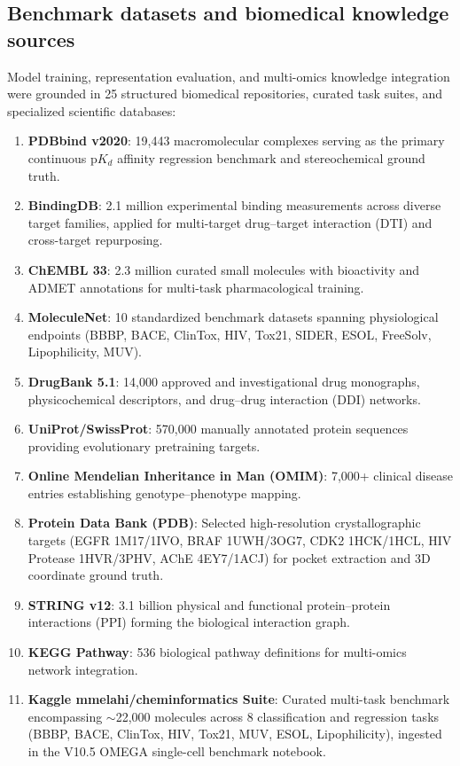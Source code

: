 \documentclass[11pt,a4paper]{article}
\begin{document}
\subsection*{Benchmark datasets and biomedical knowledge sources}
Model training, representation evaluation, and multi-omics knowledge integration were grounded in 25 structured biomedical repositories, curated task suites, and specialized scientific databases:
\begin{enumerate}
    \item \textbf{PDBbind v2020}: 19,443 macromolecular complexes serving as the primary continuous $\text{p}K_d$ affinity regression benchmark and stereochemical ground truth.
    \item \textbf{BindingDB}: 2.1 million experimental binding measurements across diverse target families, applied for multi-target drug--target interaction (DTI) and cross-target repurposing.
    \item \textbf{ChEMBL 33}: 2.3 million curated small molecules with bioactivity and ADMET annotations for multi-task pharmacological training.
    \item \textbf{MoleculeNet}: 10 standardized benchmark datasets spanning physiological endpoints (BBBP, BACE, ClinTox, HIV, Tox21, SIDER, ESOL, FreeSolv, Lipophilicity, MUV).
    \item \textbf{DrugBank 5.1}: 14,000 approved and investigational drug monographs, physicochemical descriptors, and drug--drug interaction (DDI) networks.
    \item \textbf{UniProt/SwissProt}: 570,000 manually annotated protein sequences providing evolutionary pretraining targets.
    \item \textbf{Online Mendelian Inheritance in Man (OMIM)}: 7,000+ clinical disease entries establishing genotype--phenotype mapping.
    \item \textbf{Protein Data Bank (PDB)}: Selected high-resolution crystallographic targets (EGFR 1M17/1IVO, BRAF 1UWH/3OG7, CDK2 1HCK/1HCL, HIV Protease 1HVR/3PHV, AChE 4EY7/1ACJ) for pocket extraction and 3D coordinate ground truth.
    \item \textbf{STRING v12}: 3.1 billion physical and functional protein--protein interactions (PPI) forming the biological interaction graph.
    \item \textbf{KEGG Pathway}: 536 biological pathway definitions for multi-omics network integration.
    \item \textbf{Kaggle mmelahi/cheminformatics Suite}: Curated multi-task benchmark encompassing $\sim$22,000 molecules across 8 classification and regression tasks (BBBP, BACE, ClinTox, HIV, Tox21, MUV, ESOL, Lipophilicity), ingested in the V10.5 OMEGA single-cell benchmark notebook.

\end{enumerate}
\end{document}
